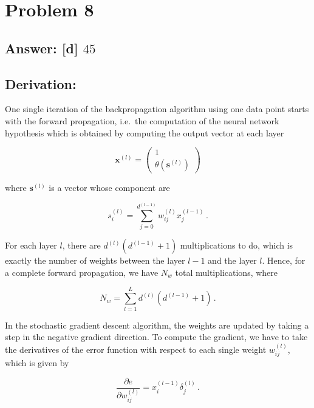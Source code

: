 \documentclass[11pt]{article}
\begin{document}
    \hypertarget{problem-8}{%
\section{Problem 8}\label{problem-8}}

\hypertarget{answer-d-45}{%
\subsection{\texorpdfstring{Answer: {[}d{]}
\(45\)}{Answer: {[}d{]} 45}}\label{answer-d-45}}

\hypertarget{derivation}{%
\subsection{Derivation:}\label{derivation}}

One single iteration of the backpropagation algorithm using one data
point starts with the forward propagation, i.e.~the computation of the
neural network hypothesis which is obtained by computing the output
vector at each layer

\begin{equation}
\mathbf{x}^{(l)}=
\begin{pmatrix}
1\\
\theta(\mathbf{s}^{(l)})
\end{pmatrix}
\end{equation}

where \(\mathbf{s}^{(l)}\) is a vector whose component are

\begin{equation}
s_i^{(l)}=\sum_{j=0}^{d^{(l-1)}}w_{ij}^{(l)}x_j^{(l-1)}\,.
\end{equation}

For each layer \(l\), there are \(d^{(l)}(d^{(l-1)}+1)\) multiplications
to do, which is exactly the number of weights between the layer \(l-1\)
and the layer \(l\). Hence, for a complete forward propagation, we have
\(N_w\) total multiplications, where

\begin{equation}
N_w=\sum_{l=1}^L d^{(l)}(d^{(l-1)}+1)\,.
\end{equation}

In the stochastic gradient descent algorithm, the weights are updated by
taking a step in the negative gradient direction. To compute the
gradient, we have to take the derivatives of the error function with
respect to each single weight \(w_{ij}^{(l)}\), which is given by

\begin{equation}
\frac{\partial e}{\partial w_{ij}^{(l)}} = x^{(l-1)}_i \delta^{(l)}_j\,.
\end{equation}
\end{document}
